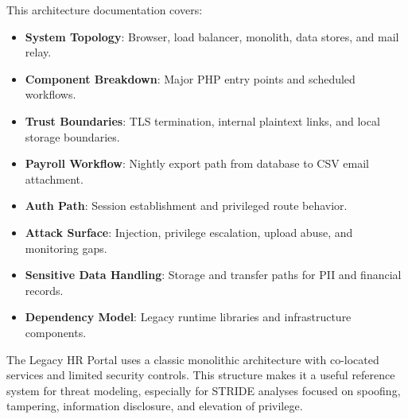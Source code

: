 \documentclass[12pt,a4paper]{article}
\begin{document}
This architecture documentation covers:
\begin{itemize}
    \item \textbf{System Topology}: Browser, load balancer, monolith, data stores, and mail relay.
    \item \textbf{Component Breakdown}: Major PHP entry points and scheduled workflows.
    \item \textbf{Trust Boundaries}: TLS termination, internal plaintext links, and local storage boundaries.
    \item \textbf{Payroll Workflow}: Nightly export path from database to CSV email attachment.
    \item \textbf{Auth Path}: Session establishment and privileged route behavior.
    \item \textbf{Attack Surface}: Injection, privilege escalation, upload abuse, and monitoring gaps.
    \item \textbf{Sensitive Data Handling}: Storage and transfer paths for PII and financial records.
    \item \textbf{Dependency Model}: Legacy runtime libraries and infrastructure components.
\end{itemize}

The Legacy HR Portal uses a classic monolithic architecture with co-located services and limited security controls. This structure makes it a useful reference system for threat modeling, especially for STRIDE analyses focused on spoofing, tampering, information disclosure, and elevation of privilege.
\end{document}
